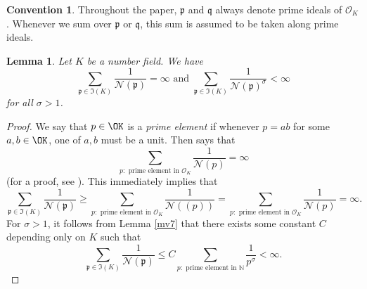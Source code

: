 \documentclass[11pt]{amsart}
\newtheorem{lemma}{Lemma}[section]
\theoremstyle{definition}
\newtheorem*{convention}{Convention}
\newtheorem*{remark}{Remark}
\newcommand{\N}{{\mathbb N}}
\newcommand{\NN}{{\mathcal N}}
\newcommand{\mf}{\mathfrak}
\begin{document}

 


\begin{convention}
Throughout the paper, $\mf p$ and $\mf q$ always denote prime ideals of $\mathcal{O}_K$. Whenever we sum over $\mf p$ or $\mf q$, this sum is assumed to be taken along prime ideals.
\end{convention}


\iffalse

\begin{lemma}\label{ggee}
Let $K$ be a number field. We have
\[
\sum_{\mf p\in\mf I(K)}\frac{1}{\NN(\mf p)}=\infty \text{ and } \sum_{\mf p\in\mf I(K)}\frac{1}{\NN(\mf p)^{\sigma}}<\infty
\]
for all $\sigma>1$.
\end{lemma}
\begin{proof}
    We say that $p\in \OK$ is a \emph{prime element} if whenever $p=ab$ for some $a,b\in\OK$, one of $a,b$ must be a unit.
Then \cite[Theorem~2.18]{S23} says that
\begin{equation}\nonumber
    \sum_{ p\colon \text{ prime element in } \mathcal{O}_K}\frac{1}{\NN(p)}=\infty %
\end{equation}
    (for a proof, see \cite[pp. 148--149]{murtyesmondebook}). This immediately implies that 
    $$\sum_{\mf p\in\mf I(K)}\frac{1}{\NN(\mf p)}\geq \sum_{ p\colon \text{ prime element in } \mathcal{O}_K}\frac{1}{\NN((p))}=\sum_{ p\colon \text{ prime element in } \mathcal{O}_K}\frac{1}{\NN(p)}=\infty.$$
For $\sigma>1$, it follows from Lemma \ref{mv7} that  there exists some constant $C$ depending only on $K$ such that
$$\sum_{\mf p\in\mf I(K)}\frac{1}{\NN(\mf p)}\leq C\sum_{\text{$p:$ prime element in $\N$}}\frac{1}{p^{\sigma}}<\infty.$$
\end{proof}



\end{document}
